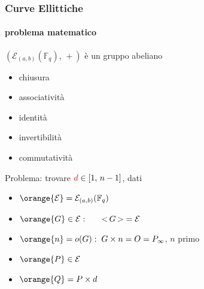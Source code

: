 \begin{frame}
	\frametitle{Curve Ellittiche}
	\framesubtitle{problema matematico}
	
	$(\mathcal{E}_{(a,b)}(\mathbb{F}_q),\,+)$ è un gruppo abeliano
	\begin{itemize}
		\item chiusura
		\item associatività
		\item identità %
		\item invertibilità %
		\item commutatività
	\end{itemize}  
	
	{\color{blue}Problema}: trovare ${\color{red}d}\in[1,\,n-1]$, dati
	\begin{itemize}
	  \item $\orange{\mathcal{E}}=\mathcal{E}_{(a,b)}(\mathbb{F}_q)$
	  \item $\orange{G}\in \mathcal{E}:\;\;\;\;\;\;\tiny{<}\,G\,\tiny{>}=\mathcal{E}$
	  \item $\orange{n}=o(G):\;G\times n= O=P_\infty$, $n$ primo
	  \item $\orange{P}\in \mathcal{E}$
	  \item $\orange{Q}=P\times d$
	\end{itemize}
\end{frame}